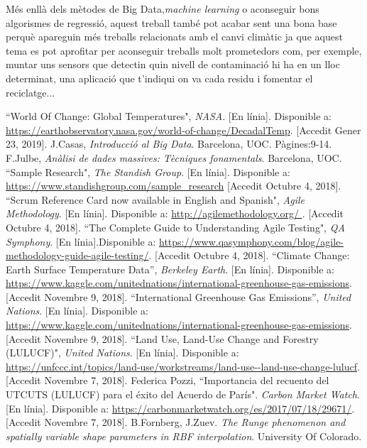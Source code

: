 \documentclass[10pt,a4paper,twocolumn,twoside]{article}
\begin{document}
Més enllà dels mètodes de Big Data,\textit{machine learning} o aconseguir bons algorismes de regressió, aquest treball també pot acabar sent una bona base perquè apareguin més treballs relacionats amb el canvi climàtic ja que aquest tema es pot aprofitar per aconseguir treballs molt prometedors com, per exemple, muntar uns sensors que detectin quin nivell de contaminació hi ha en un lloc determinat, una aplicació que t'indiqui on va cada residu i fomentar el reciclatge...


\begin{thebibliography}{11}
``World Of Change: Global Temperatures", \textit{NASA}. [En línia]. Disponible a: \url{https://earthobservatory.nasa.gov/world-of-change/DecadalTemp}. [Accedit Gener 23, 2019].
J.Casas, \textit{Introducció al Big Data}. Barcelona, UOC. Pàgines:9-14.
F.Julbe, \textit{Anàlisi de dades massives: Tècniques fonamentals}. Barcelona, UOC.
``Sample Research", \textit{The Standish Group}. [En línia]. Disponible a: \url{https://www.standishgroup.com/sample_research} [Accedit Octubre 4, 2018].
``Scrum Reference Card now available in English and Spanish",  \textit{Agile Methodology}. [En línia]. Disponible a: \url{http://agilemethodology.org/ }. [Accedit Octubre 4, 2018].
``The Complete Guide to Understanding Agile Testing", \textit{QA Symphony}. [En línia].Disponible a: \url{https://www.qasymphony.com/blog/agile-methodology-guide-agile-testing/}. [Accedit Octubre 4, 2018].
``Climate Change: Earth Surface Temperature Data”, \textit{Berkeley Earth}. [En línia]. Disponible a: \url{ https://www.kaggle.com/unitednations/international-greenhouse-gas-emissions}. [Accedit Novembre 9, 2018].
 ``International Greenhouse Gas Emissions”, \textit{United Nations}. [En línia]. Disponible a: \url{ https://www.kaggle.com/unitednations/international-greenhouse-gas-emissions}. [Accedit Novembre 9, 2018].
 ``Land Use, Land-Use Change and Forestry (LULUCF)", \textit{United Nations}. [En línia]. Disponible a: \url{ https://unfccc.int/topics/land-use/workstreams/land-use--land-use-change-lulucf}. [Accedit Novembre 7, 2018].
Federica Pozzi, ``Importancia del recuento del UTCUTS (LULUCF) para el éxito del Acuerdo de París". \textit{Carbon Market Watch}. [En línia]. Disponible a: \url{https://carbonmarketwatch.org/es/2017/07/18/29671/}. [Accedit Novembre 7, 2018].
B.Fornberg, J.Zuev. \textit{The Runge phenomenon and spatially variable shape parameters in RBF interpolation}. University Of Colorado.

\end{thebibliography}
\end{document}
